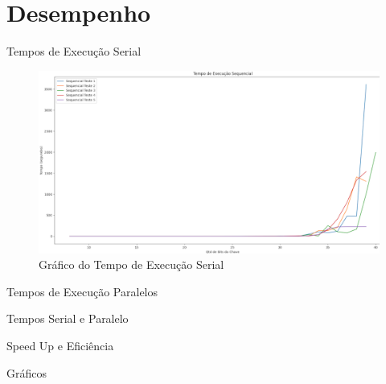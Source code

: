 \documentclass[xcolor=table]{beamer}
\begin{document}
    \section[]{Desempenho}
    \begin{frame}{Tempos de Execução Serial}
        \begin{adjustwidth}{-1cm}{}
            \begin{figure}[htbp]
                \centering
                \includegraphics[scale=.42]{Figuras/TempoExecuçãoSerial1.png}
                \caption{Gráfico do Tempo de Execução Serial}
            \end{figure}
        \end{adjustwidth}
    \end{frame}

    \begin{frame}{Tempos de Execução Paralelos}
   
    \end{frame}

    \begin{frame}{Tempos Serial e Paralelo}
   
    \end{frame}

    \begin{frame}{Speed Up e Eficiência}
   
    \end{frame}

    \begin{frame}{Gráficos}

    \end{frame}
\end{document}
